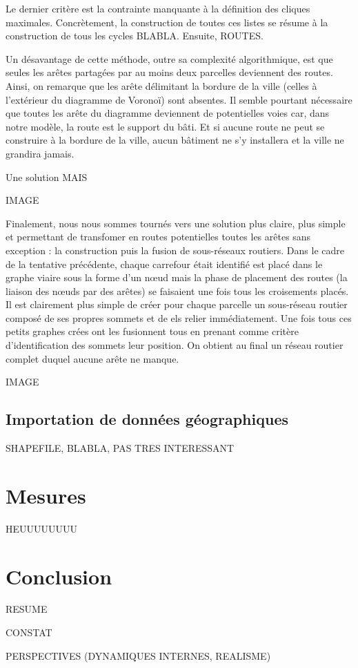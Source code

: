 \documentclass[10pt]{article}
\begin{document}
Le dernier critère est la contrainte manquante à la définition des
cliques maximales. Concrètement, la construction de toutes ces listes
se résume à la construction de tous les cycles BLABLA. Ensuite,
ROUTES.

Un désavantage de cette méthode, outre sa complexité algorithmique,
est que seules les arêtes partagées par au moins deux parcelles
deviennent des routes. Ainsi, on remarque que les arête délimitant la
bordure de la ville (celles à l'extérieur du diagramme de Voronoï)
sont absentes. Il semble pourtant nécessaire que toutes les arête du
diagramme deviennent de potentielles voies car, dans notre modèle, la
route est le support du bâti. Et si aucune route ne peut se construire
à la bordure de la ville, aucun bâtiment ne s'y installera et la ville
ne grandira jamais.

Une solution MAIS

IMAGE

Finalement, nous nous sommes tournés vers une solution plus claire,
plus simple et permettant de transfomer en routes potentielles toutes
les arêtes sans exception : la construction puis la fusion de
sous-réseaux routiers. Dans le cadre de la tentative précédente,
chaque carrefour était identifié est placé dans le graphe viaire sous
la forme d'un n\oe ud mais la phase de placement des routes (la
liaison des n\oe uds par des arêtes) se faisaient une fois tous les
croisements placés. Il est clairement plus simple de créer pour chaque
parcelle un sous-réseau routier composé de ses propres sommets et de
els relier immédiatement. Une fois tous ces petits graphes crées ont
les fusionnent tous en prenant comme critère d'identification des
sommets leur position. On obtient au final un réseau routier complet
duquel aucune arête ne manque.

IMAGE

\subsection{Importation de données géographiques}

SHAPEFILE, BLABLA, PAS TRES INTERESSANT

\section{Mesures}

HEUUUUUUUU

\section{Conclusion}

RESUME

CONSTAT

PERSPECTIVES (DYNAMIQUES INTERNES, REALISME)

\printbibliography
\end{document}
